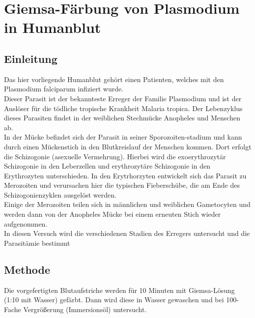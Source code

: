 \documentclass[oneside,10pt,a4paper]{report}
\begin{document}
		\section{Giemsa-Färbung von Plasmodium in Humanblut}
			\subsection{Einleitung}
				Das hier vorliegende Humanblut gehört einen Patienten, welches mit den Plasmodium falciparum infiziert wurde.\\
				Dieser Parasit ist der bekannteste Erreger der Familie Plasmodium und ist der Auslöser für die tödliche tropische Krankheit Malaria tropica\cite{malaria}.
				Der Lebenzyklus dieses Parasiten findet in der weiblichen Stechmücke Anopheles und Menschen ab.\\
				In der Mücke befindet sich der Parasit in seiner Sporozoiten-stadium und kann durch einen Mückenstich in den Blutkreislauf der Menschen kommen. Dort erfolgt die Schizogonie (asexuelle Vermehrung). Hierbei wird die exoerythrozytär Schizogonie in den Leberzellen und erythrozytäre Schizogonie in den Erythrozyten unterschieden. 
				In den Erytrhorzyten entwickelt sich das Parasit zu Merozoiten und verursachen hier die typischen Fieberschübe, die am Ende des Schizogonienzyklen ausgelöst werden.\\
				Einige der Merozoiten teilen sich in männlichen und weiblichen Gametocyten und werden dann von der Anopheles Mücke bei einem erneuten Stich wieder aufgenommen.\\
				In diesen Versuch wird die verschiedenen Stadien des Erregers untersucht und die Parasitämie bestimmt
			\subsection{Methode}
				Die vorgefertigten Blutaufstriche werden für 10 Minuten mit Giemsa-Lösung (1:10 mit Wasser) gefärbt. Dann wird diese in Wasser gewaschen und bei 100-Fache Vergrößerung (Immersionsöl) untersucht.
				
\end{document}
